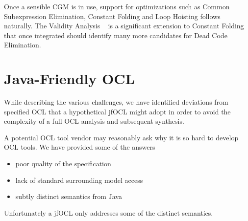\documentclass[sigconf]{acmart}
\begin{document}
Once a sensible CGM is in use, support for optimizations such as Common Subexpression Elimination, Constant Folding and Loop Hoisting follows naturally. The Validity Analysis ~\cite{Willink2021} is a significant extension to Constant Folding that once integrated should identify many more candidates for Dead Code Elimination.

\section{Java-Friendly OCL}\label{Java-Friendly OCL}

While describing the various challenges, we have identified deviations from specified OCL that a hypothetical jfOCL might adopt in order to avoid the complexity of a full OCL analysis and subsequent synthesis.

A potential OCL tool vendor may reasonably ask why it is so hard to develop OCL tools. We have provided some of the answers

\begin{itemize}
	\item poor quality of the specification
	\item lack of standard surrounding model access
	\item subtly distinct semantics from Java
\end{itemize}

Unfortunately a jfOCL only addresses some of the distinct semantics.
\end{document}
